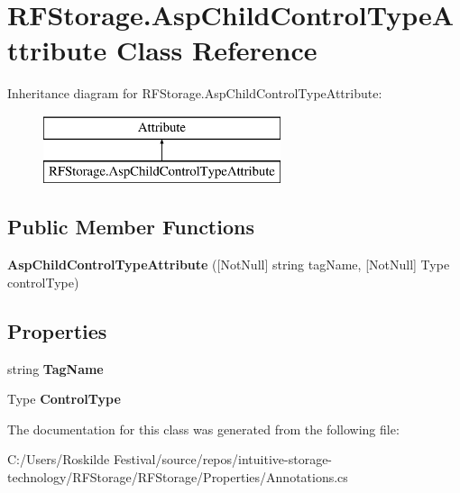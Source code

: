 \hypertarget{class_r_f_storage_1_1_asp_child_control_type_attribute}{}\section{R\+F\+Storage.\+Asp\+Child\+Control\+Type\+Attribute Class Reference}
\label{class_r_f_storage_1_1_asp_child_control_type_attribute}
Inheritance diagram for R\+F\+Storage.\+Asp\+Child\+Control\+Type\+Attribute\+:\begin{figure}[H]
\begin{center}
\leavevmode
\includegraphics[height=2.000000cm]{class_r_f_storage_1_1_asp_child_control_type_attribute}
\end{center}
\end{figure}
\subsection*{Public Member Functions}
\begin{DoxyCompactItemize}
\item 
\mbox{\label{class_r_f_storage_1_1_asp_child_control_type_attribute_a8485de61e09d066718f447254c2a5dbc}} 
{\bfseries Asp\+Child\+Control\+Type\+Attribute} (\mbox{[}Not\+Null\mbox{]} string tag\+Name, \mbox{[}Not\+Null\mbox{]} Type control\+Type)
\end{DoxyCompactItemize}
\subsection*{Properties}
\begin{DoxyCompactItemize}
\item 
\mbox{\label{class_r_f_storage_1_1_asp_child_control_type_attribute_af6a5c14d9d185ee9648c919efc065d1b}} 
string {\bfseries Tag\+Name}
\item 
\mbox{\label{class_r_f_storage_1_1_asp_child_control_type_attribute_a4815bb28e6242994d2f1b2c84177b846}} 
Type {\bfseries Control\+Type}
\end{DoxyCompactItemize}


The documentation for this class was generated from the following file\+:\begin{DoxyCompactItemize}
\item 
C\+:/\+Users/\+Roskilde Festival/source/repos/intuitive-\/storage-\/technology/\+R\+F\+Storage/\+R\+F\+Storage/\+Properties/Annotations.\+cs\end{DoxyCompactItemize}
